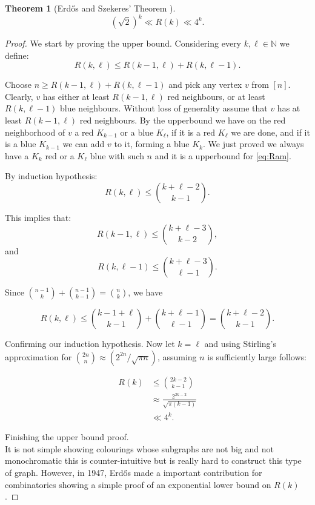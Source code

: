 \documentclass[12pt,twoside,a4paper,bibliography=totocnumbered]{book}
\numberwithin{equation}{section}
\newtheorem{theorem}             {Theorem}[section]
\theoremstyle{remark}
\begin{document}
\begin{theorem}[{Erd\H{o}s and Szekeres' Theorem \cite{ersz35, Er47}}]\label{thm:ErdosandS}
$$(\sqrt{2})^k \ll R(k) \ll 4^k.$$
\end{theorem}
\begin{proof} We start by proving the upper bound. Considering every $k, \ell \in \mathbb{N}$ we define:\\
\begin{equation}\label{eq:Ram}
R(k,\ell ) \leq R(k-1,\ell )+R(k,\ell-1).
\end{equation}

Choose $n \geq R(k-1,\ell) + R(k, \ell-1)$ and pick any vertex $v$ from $[n]$. Clearly, $v$ has either at least $R(k-1,\ell)$ red neighbours, or at least $R(k,\ell-1)$ blue neighbours. Without loss of generality assume that $v$ has at least $R(k-1,\ell)$ red neighbours. By the upperbound we have on the red neighborhood of $v$ a red $K_{k-1}$ or a blue $K_{\ell}$, if it is a red $K_{\ell}$ we are done, and if it is a blue $K_{k-1}$ we can add $v$ to it, forming a blue $K_k$. We just proved we always have a $K_k$ red or a $K_{\ell}$ blue with such $n$ and it is a upperbound for \ref{eq:Ram}.

By induction hypothesis:
$$R(k,\ell) \leq \binom{k+\ell - 2}{k - 1}.$$

This implies that:
$$R(k-1,\ell)\leq \binom{k+\ell -3}{k-2},$$ and $$R(k,\ell-1)\leq \binom{k+\ell-3}{\ell-1}.$$

Since $\binom{n-1}{k} + \binom{n-1}{k-1} = \binom{n}{k}$, we have

$$R(k,\ell)\leq \binom{k-1+\ell}{k-1} + \binom{k+\ell-1}{\ell-1} = \binom{k+ \ell -2}{k-1}.$$

Confirming our induction hypothesis. Now let $k = \ell$ and using Stirling's approximation for $\binom{2n}{n} \approx (2^{2n}/\sqrt{\pi n})$, assuming $n$ is sufficiently large follows:

\begin{align*}
R(k) &\leq \binom{2k -2}{k-1}\\
& \approx \frac{2^{2k-2}}{\sqrt{\pi (k-1)}}\\
& \ll 4^k.
\end{align*}

Finishing the upper bound proof.\\

It is not simple showing colourings whose subgraphs are not big and not monochromatic this is counter-intuitive but is really hard to construct this type of graph. However, in 1947, Erd\H{o}s made a important contribution for combinatorics showing a simple proof of an exponential lower bound on $R(k)$.


\end{proof}
\end{document}
